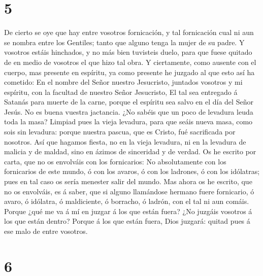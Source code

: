\hypertarget{section-4}{%
\section{5}\label{section-4}}

 De cierto se oye que hay entre vosotros fornicación, y tal
fornicación cual ni aun se nombra entre los Gentiles; tanto que alguno
tenga la mujer de su padre.  Y vosotros estáis hinchados, y
no más bien tuvisteis duelo, para que fuese quitado de en medio de
vosotros el que hizo tal obra.  Y ciertamente, como ausente
con el cuerpo, mas presente en espíritu, ya como presente he juzgado al
que esto así ha cometido:  En el nombre del Señor nuestro
Jesucristo, juntados vosotros y mi espíritu, con la facultad de nuestro
Señor Jesucristo,  El tal sea entregado á Satanás para
muerte de la carne, porque el espíritu sea salvo en el día del Señor
Jesús.  No es buena vuestra jactancia. ¿No sabéis que un
poco de levadura leuda toda la masa?  Limpiad pues la vieja
levadura, para que seáis nueva masa, como sois sin levadura: porque
nuestra pascua, que es Cristo, fué sacrificada por nosotros.
 Así que hagamos fiesta, no en la vieja levadura, ni en la
levadura de malicia y de maldad, sino en ázimos de sinceridad y de
verdad.  Os he escrito por carta, que no os envolváis con
los fornicarios:  No absolutamente con los fornicarios de
este mundo, ó con los avaros, ó con los ladrones, ó con los idólatras;
pues en tal caso os sería menester salir del mundo.  Mas
ahora os he escrito, que no os envolváis, es á saber, que si alguno
llamándose hermano fuere fornicario, ó avaro, ó idólatra, ó maldiciente,
ó borracho, ó ladrón, con el tal ni aun comáis.  Porque
¿qué me va á mí en juzgar á los que están fuera? ¿No juzgáis vosotros á
los que están dentro?  Porque á los que están fuera, Dios
juzgará: quitad pues á ese malo de entre vosotros.

\hypertarget{section-5}{%
\section{6}\label{section-5}}


